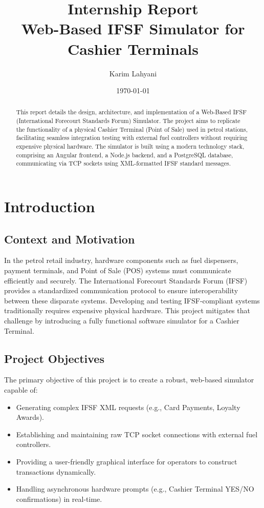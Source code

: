 \documentclass[12pt,a4paper]{report}
\title{
    \vspace{2cm}
    \textbf{Internship Report} \\
    \vspace{0.5cm}
    \Large{Web-Based IFSF Simulator for Cashier Terminals} \\
    \vspace{1cm}
}
\author{Karim Lahyani}
\date{\today}
\begin{document}
\maketitle

\begin{abstract}
This report details the design, architecture, and implementation of a Web-Based IFSF (International Forecourt Standards Forum) Simulator. The project aims to replicate the functionality of a physical Cashier Terminal (Point of Sale) used in petrol stations, facilitating seamless integration testing with external fuel controllers without requiring expensive physical hardware. The simulator is built using a modern technology stack, comprising an Angular frontend, a Node.js backend, and a PostgreSQL database, communicating via TCP sockets using XML-formatted IFSF standard messages.
\end{abstract}

\tableofcontents

\chapter{Introduction}
\section{Context and Motivation}
In the petrol retail industry, hardware components such as fuel dispensers, payment terminals, and Point of Sale (POS) systems must communicate efficiently and securely. The International Forecourt Standards Forum (IFSF) provides a standardized communication protocol to ensure interoperability between these disparate systems. Developing and testing IFSF-compliant systems traditionally requires expensive physical hardware. This project mitigates that challenge by introducing a fully functional software simulator for a Cashier Terminal.

\section{Project Objectives}
The primary objective of this project is to create a robust, web-based simulator capable of:
\begin{itemize}
    \item Generating complex IFSF XML requests (e.g., Card Payments, Loyalty Awards).
    \item Establishing and maintaining raw TCP socket connections with external fuel controllers.
    \item Providing a user-friendly graphical interface for operators to construct transactions dynamically.
    \item Handling asynchronous hardware prompts (e.g., Cashier Terminal YES/NO confirmations) in real-time.
\end{itemize}
\end{document}
